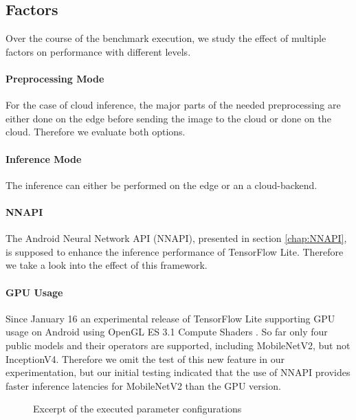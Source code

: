 \subsection{Factors}
Over the course of the benchmark execution, we study the effect of multiple factors on performance with different levels.

\paragraph{Preprocessing Mode}
For the case of cloud inference, the major parts of the needed preprocessing are either done on the edge before sending the image to the cloud or done on the cloud. Therefore we evaluate both options.
\paragraph{Inference Mode}
The inference can either be performed on the edge or an a cloud-backend.


\paragraph{NNAPI}
The Android Neural Network API (NNAPI), presented in section \ref{chap:NNAPI}, is supposed to enhance the inference performance of TensorFlow Lite. Therefore we take a look into the effect of this framework.
\paragraph{GPU Usage}
Since January 16 an experimental release of TensorFlow Lite supporting GPU usage on Android using OpenGL ES 3.1 Compute Shaders \cite{tfLiteGPU}.
So far only four public models and their operators are supported, including MobileNetV2, but not InceptionV4. 
Therefore we omit the test of this new feature in our experimentation, but our initial testing indicated that the use of NNAPI provides faster inference latencies for MobileNetV2 than the GPU version.


\begin{figure}[!htb]
\centering
 \scalebox{.7}{}

\caption{Excerpt of the executed parameter configurations}
\label{fig:tree}
\end{figure}


